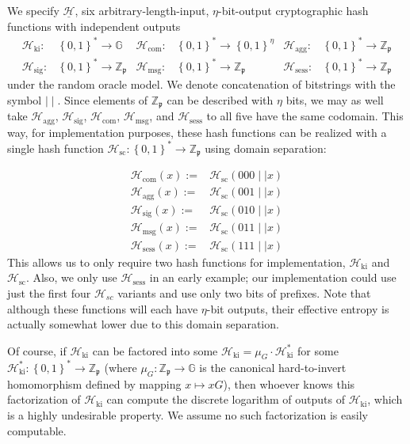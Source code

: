 \documentclass{iacrtrans}
\theoremstyle{definition}
\numberwithin{theorem}{subsection}
\numberwithin{lemma}{theorem}
\newcommand{\scalarField}{\mathbb{Z}_{\mathfrak{p}}}
\newcommand{\group}{\mathbb{G}}
\begin{document}
We specify $\underline{\mathcal{H}}$, six arbitrary-length-input, $\eta$-bit-output cryptographic hash functions with independent outputs
\begin{align*}
\mathcal{H}_{\text{ki}}:& \left\{0,1\right\}^* \to \group & \mathcal{H}_{\text{com}}:& \left\{0,1\right\}^* \to \left\{0,1\right\}^\eta & \mathcal{H}_{\text{agg}}:&  \left\{0,1\right\}^* \to \scalarField \\ \mathcal{H}_{\text{sig}}:& \left\{0,1\right\}^* \to \scalarField &
\mathcal{H}_{\text{msg}}:& \left\{0,1\right\}^* \to \scalarField &
\mathcal{H}_{\text{sess}}:& \left\{0,1\right\}^* \to \scalarField
\end{align*} under the random oracle model. We denote concatenation of bitstrings with the symbol $\mid \mid$. Since elements of $\scalarField$ can be described with $\eta$ bits, we may as well take $\mathcal{H}_{\text{agg}}$, $\mathcal{H}_{\text{sig}}$, $\mathcal{H}_{\text{com}}$, $\mathcal{H}_{\text{msg}}$, and $\mathcal{H}_{\text{sess}}$ to all five have the same codomain. This way, for implementation purposes, these hash functions can be realized with a single hash function $\mathcal{H}_{\text{sc}}:\left\{0,1\right\}^* \to \scalarField$ using domain separation:

\begin{align*}
\mathcal{H}_{\text{com}}(x) :=& \mathcal{H}_{\text{sc}}(000 \mid \mid x)\\
\mathcal{H}_{\text{agg}}(x) :=& \mathcal{H}_{\text{sc}}(001 \mid \mid x) \\ 
\mathcal{H}_{\text{sig}}(x) :=& \mathcal{H}_{\text{sc}}(010\mid \mid x) \\
\mathcal{H}_{\text{msg}}(x) :=& \mathcal{H}_{\text{sc}}(011\mid \mid x) \\
\mathcal{H}_{\text{sess}}(x) :=& \mathcal{H}_{\text{sc}}(111\mid \mid x)
\end{align*} This allows us to only require two hash functions for implementation, $\mathcal{H}_{\text{ki}}$ and $\mathcal{H}_{\text{sc}}$. Also, we only use $\mathcal{H}_{\text{sess}}$ in an early example; our implementation could use just the first four $\mathcal{H}_{sc}$ variants and use only two bits of prefixes. Note that although these functions will each have $\eta$-bit outputs, their effective entropy is actually somewhat lower due to this domain separation.%

Of course, if $\mathcal{H}_{\text{ki}}$ can be factored into some $\mathcal{H}_{\text{ki}} = \mu_G \cdot \mathcal{H}_{\text{ki}}^*$ for some $\mathcal{H}_{\text{ki}}^*:\left\{0,1\right\}^* \to \scalarField$ (where $\mu_G: \scalarField \to \group$ is the canonical hard-to-invert homomorphism defined by mapping $x \mapsto xG$), then whoever knows this factorization  of $\mathcal{H}_{\text{ki}}$ can compute the discrete logarithm of outputs of $\mathcal{H}_{\text{ki}}$, which is a highly undesirable property. We assume no such factorization is easily computable.
\end{document}
